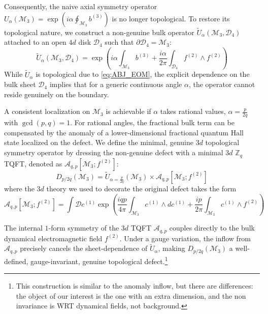 \documentclass[aps,preprint,nofootinbib,preprintnumbers,eqsecnum,superscriptaddress]{revtex4}
\numberwithin{equation}{section}
\begin{document}
Consequently, the naive axial symmetry operator $U_\alpha(\mathcal{M}_3) = \exp(i\alpha \oint_{\mathcal{M}_3} b^{(3)} )$ is no longer topological. To restore its topological nature, we construct a non-genuine bulk operator $\widetilde{U}_\alpha(\mathcal{M}_3, \mathcal{D}_4)$ attached to an open $4d$ disk $\mathcal{D}_4$ such that $\partial \mathcal{D}_4 = \mathcal{M}_3$:
\begin{equation}
    \widetilde{U}_\alpha(\mathcal{M}_3, \mathcal{D}_4) = \exp\left(i\alpha \int_{\mathcal{M}_3} b^{(3)} + \frac{i\alpha}{2\pi} \int_{\mathcal{D}_4} f^{(2)} \wedge f^{(2)}\right)
\end{equation}
While $\widetilde{U}_\alpha$ is topological due to \eqref{eq:ABJ_EOM}, the explicit dependence on the bulk sheet $\mathcal{D}_4$ implies that for a generic continuous angle $\alpha$, the operator cannot reside genuinely on the boundary.

A consistent localization on $\mathcal{M}_3$ is achievable if $\alpha$ takes rational values, $\alpha = \frac{p}{2q}$ with $\gcd(p,q)=1$. For rational angles, the fractional bulk term can be compensated by the anomaly of a lower-dimensional fractional quantum Hall state localized on the defect. We define the minimal, genuine $3d$ topological symmetry operator by dressing the non-genuine defect with a minimal $3d$ $\mathbb{Z}_q$ TQFT, denoted as $\mathcal{A}_{q,p}[\mathcal{M}_3; f^{(2)}]$:
\begin{equation}\label{eq:non_inv_defect_def}
    D_{p/2q}(\mathcal{M}_3) = \widetilde{U}_{\alpha = \frac{p}{2q}}(\mathcal{M}_3) \times \mathcal{A}_{q,p}[\mathcal{M}_3; f^{(2)}]
\end{equation}
where the $3d$ theory we used to decorate the original defect takes the form
\begin{equation}
    \mathcal{A}_{q,p}[\mathcal{M}_3; f^{(2)}] = \int \mathcal{D}c^{(1)} \exp\left( \frac{iqp}{4\pi}\int_{\mathcal{M}_3} c^{(1)} \wedge dc^{(1)} + \frac{ip}{2\pi}\int_{\mathcal{M}_3} c^{(1)} \wedge f^{(2)} \right)
\end{equation}

The internal $1$-form symmetry of the $3d$ TQFT $\mathcal{A}_{q,p}$ couples directly to the bulk dynamical electromagnetic field $f^{(2)}$. Under a gauge variation, the inflow from $\mathcal{A}_{q,p}$ precisely cancels the sheet-dependence of $\widetilde{U}_\alpha$, making $D_{p/2q}(\mathcal{M}_3)$ a well-defined, gauge-invariant, genuine topological defect.\footnote{This construction is similar to the anomaly inflow, but there are differences: the object of our interest is the one with an extra dimension, and the non invariance is WRT dynamical fields, not background.} 
\end{document}
